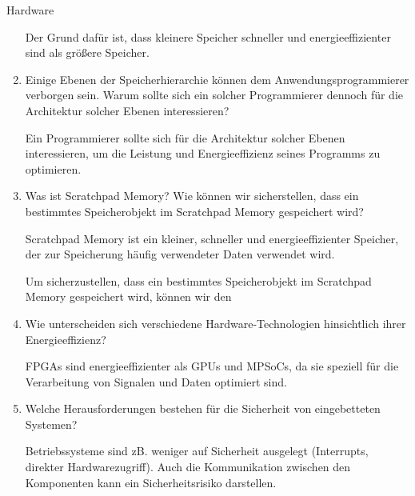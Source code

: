 \documentclass{article}
\begin{document}
\begin{exercise}{Hardware}
\begin{enumerate}
          \begin{solution}
            Der Grund dafür ist, dass kleinere Speicher schneller und energieeffizienter sind als größere Speicher.
          \end{solution}

    \item  Einige Ebenen der Speicherhierarchie können dem Anwendungsprogrammierer verborgen sein. Warum sollte sich ein solcher Programmierer dennoch für die Architektur solcher Ebenen interessieren?

          \begin{solution}
            Ein Programmierer sollte sich für die Architektur solcher Ebenen interessieren, um die Leistung und Energieeffizienz seines Programms zu optimieren.
          \end{solution}

    \item Was ist Scratchpad Memory? Wie können wir sicherstellen, dass ein bestimmtes Speicherobjekt im Scratchpad Memory gespeichert wird?

          \begin{solution}
            Scratchpad Memory ist ein kleiner, schneller und energieeffizienter Speicher, der zur Speicherung häufig verwendeter Daten verwendet wird.

            Um sicherzustellen, dass ein bestimmtes Speicherobjekt im Scratchpad Memory gespeichert wird, können wir den
          \end{solution}

    \item Wie unterscheiden sich verschiedene Hardware-Technologien hinsichtlich ihrer Energieeffizienz?

          \begin{solution}
            FPGAs sind energieeffizienter als GPUs und MPSoCs, da sie speziell für die Verarbeitung von Signalen und Daten optimiert sind.
          \end{solution}

    \item Welche Herausforderungen bestehen für die Sicherheit von eingebetteten Systemen?

          \begin{solution}
            Betriebssysteme sind zB. weniger auf Sicherheit ausgelegt (Interrupts, direkter Hardwarezugriff). Auch die Kommunikation zwischen den Komponenten kann ein Sicherheitsrisiko darstellen.
          \end{solution}
  \end{enumerate}
\end{exercise}
\end{document}
